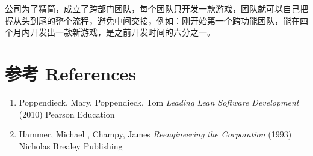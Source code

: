 公司为了精简，成立了跨部门团队，每个团队只开发一款游戏，团队就可以自己把握从头到尾的整个流程，避免中间交接，例如：刚开始第一个跨功能团队，能在四个月内开发出一款新游戏，是之前开发时间的六分之一。

\hypertarget{ux53c2ux8003-references}{%
\section{参考 References}\label{ux53c2ux8003-references}}

\begin{enumerate}
\tightlist
\item
  Poppendieck, Mary, Poppendieck, Tom \emph{Leading Lean Software
  Development} (2010) Pearson Education\\
\item
  Hammer, Michael , Champy, James \emph{Reengineering the Corporation}
  (1993) Nicholas Brealey Publishing\\
\end{enumerate}


